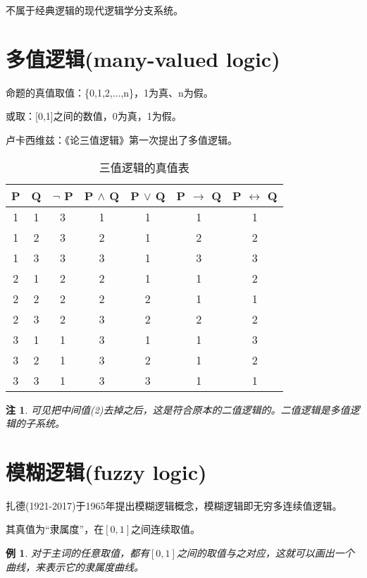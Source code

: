 \documentclass[12pt,onecolumn,a4paper]{book}
\newtheorem*{example}{例}
\newtheorem*{note}{注}
\numberwithin{table}{subsection}
\numberwithin{equation}{subsection}
\begin{document}
不属于经典逻辑的现代逻辑学分支系统。

\section{多值逻辑(many-valued logic)}

命题的真值取值：\{0,1,2,...,n\}，1为真、n为假。

或取：[0,1]之间的数值，0为真，1为假。

卢卡西维兹：《论三值逻辑》第一次提出了多值逻辑。

\begin{table}
    \begin{center}
    \begin{tabular}{ccccccc}
    \hline
    P & Q & $\neg$ P & P $\wedge$ Q & P $\vee$ Q & P $\rightarrow$ Q & P $\leftrightarrow$ Q \\
    \hline
    1 & 1 & 3 & 1 & 1 & 1 & 1 \\
    1 & 2 & 3 & 2 & 1 & 2 & 2 \\
    1 & 3 & 3 & 3 & 1 & 3 & 3 \\
    2 & 1 & 2 & 2 & 1 & 1 & 2 \\
    2 & 2 & 2 & 2 & 2 & 1 & 1 \\
    2 & 3 & 2 & 3 & 2 & 2 & 2 \\
    3 & 1 & 1 & 3 & 1 & 1 & 3 \\
    3 & 2 & 1 & 3 & 2 & 1 & 2 \\
    3 & 3 & 1 & 3 & 3 & 1 & 1 \\
    \hline
    \end{tabular}
    \end{center}
    \caption{三值逻辑的真值表}
\end{table}

\newpage

\begin{note}
    可见把中间值(2)去掉之后，这是符合原本的二值逻辑的。二值逻辑是多值逻辑的子系统。
\end{note}

\section{模糊逻辑(fuzzy logic)}

扎德(1921-2017)于1965年提出模糊逻辑概念，模糊逻辑即无穷多连续值逻辑。

其真值为“隶属度”，在$[0,1]$之间连续取值。

\begin{example}
    对于主词的任意取值，都有$[0,1]$之间的取值与之对应，这就可以画出一个曲线，来表示它的隶属度曲线。
\end{example}
\end{document}
